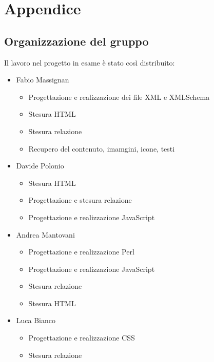 \section{Appendice}

\subsection{Organizzazione del gruppo}

Il lavoro nel progetto in esame è stato così distribuito:

\begin{itemize}

    \item Fabio Massignan
    \begin{itemize}

        \item Progettazione e realizzazione dei file XML e XMLSchema
        \item Stesura HTML
        \item Stesura relazione
        \item Recupero del contenuto, imamgini, icone, testi
    \end{itemize}

    \item Davide Polonio
    \begin{itemize}

        \item Stesura HTML
        \item Progettazione e stesura relazione
        \item Progettazione e realizzazione JavaScript

    \end{itemize}

    \item Andrea Mantovani
    \begin{itemize}

        \item Progettazione e realizzazione Perl
        \item Progettazione e realizzazione JavaScript
        \item Stesura relazione
        \item Stesura HTML

    \end{itemize}

    \item Luca Bianco
    \begin{itemize}

        \item Progettazione e realizzazione CSS
        \item Stesura relazione

    \end{itemize}


\end{itemize}
